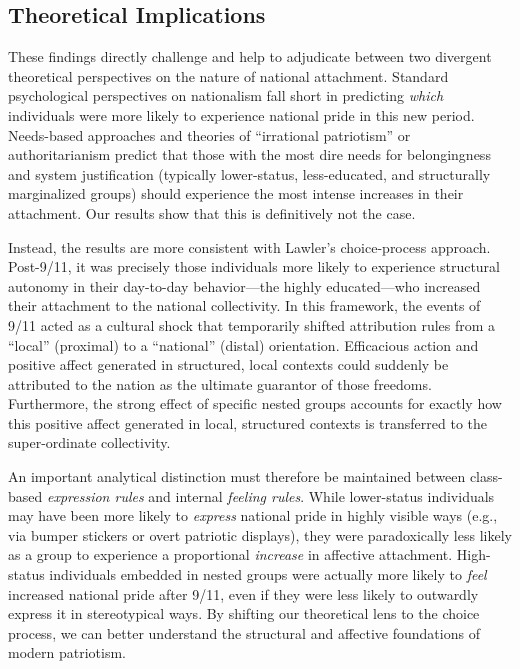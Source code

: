 \documentclass[12pt,letterpaper]{article}
\begin{document}
\subsection{Theoretical Implications}
These findings directly challenge and help to adjudicate between two divergent theoretical perspectives on the nature of national attachment. Standard psychological perspectives on nationalism fall short in predicting \textit{which} individuals were more likely to experience national pride in this new period. Needs-based approaches and theories of ``irrational patriotism'' or authoritarianism predict that those with the most dire needs for belongingness and system justification (typically lower-status, less-educated, and structurally marginalized groups) should experience the most intense increases in their attachment. Our results show that this is definitively not the case. 

Instead, the results are more consistent with Lawler's \citeyearpar{lawler1992affective-8c8} choice-process approach. Post-9/11, it was precisely those individuals more likely to experience structural autonomy in their day-to-day behavior---the highly educated---who increased their attachment to the national collectivity. In this framework, the events of 9/11 acted as a cultural shock that temporarily shifted attribution rules from a ``local'' (proximal) to a ``national'' (distal) orientation. Efficacious action and positive affect generated in structured, local contexts could suddenly be attributed to the nation as the ultimate guarantor of those freedoms. Furthermore, the strong effect of specific nested groups accounts for exactly how this positive affect generated in local, structured contexts is transferred to the super-ordinate collectivity. 

An important analytical distinction must therefore be maintained between class-based \textit{expression rules} and internal \textit{feeling rules}. While lower-status individuals may have been more likely to \textit{express} national pride in highly visible ways (e.g., via bumper stickers or overt patriotic displays), they were paradoxically less likely as a group to experience a proportional \textit{increase} in affective attachment. High-status individuals embedded in nested groups were actually more likely to \textit{feel} increased national pride after 9/11, even if they were less likely to outwardly express it in stereotypical ways. By shifting our theoretical lens to the choice process, we can better understand the structural and affective foundations of modern patriotism.
\end{document}
